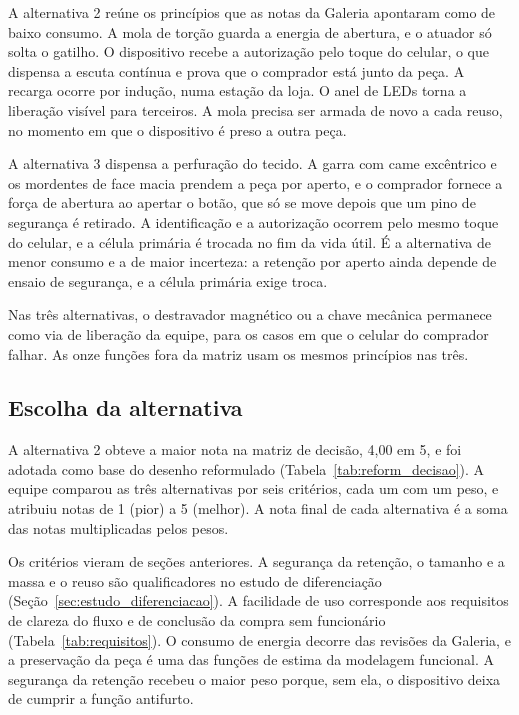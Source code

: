 A alternativa 2 reúne os princípios que as notas da Galeria apontaram como de baixo consumo. A mola de torção guarda a energia de abertura, e o atuador só solta o gatilho. O dispositivo recebe a autorização pelo toque do celular, o que dispensa a escuta contínua e prova que o comprador está junto da peça. A recarga ocorre por indução, numa estação da loja. O anel de LEDs torna a liberação visível para terceiros. A mola precisa ser armada de novo a cada reuso, no momento em que o dispositivo é preso a outra peça.

A alternativa 3 dispensa a perfuração do tecido. A garra com came excêntrico e os mordentes de face macia prendem a peça por aperto, e o comprador fornece a força de abertura ao apertar o botão, que só se move depois que um pino de segurança é retirado. A identificação e a autorização ocorrem pelo mesmo toque do celular, e a célula primária é trocada no fim da vida útil. É a alternativa de menor consumo e a de maior incerteza: a retenção por aperto ainda depende de ensaio de segurança, e a célula primária exige troca.

Nas três alternativas, o destravador magnético ou a chave mecânica permanece como via de liberação da equipe, para os casos em que o celular do comprador falhar. As onze funções fora da matriz usam os mesmos princípios nas três.

\subsection{Escolha da alternativa}
\label{subsec:reform_escolha}

A alternativa 2 obteve a maior nota na matriz de decisão, 4,00 em 5, e foi adotada como base do desenho reformulado (Tabela~\ref{tab:reform_decisao}). A equipe comparou as três alternativas por seis critérios, cada um com um peso, e atribuiu notas de 1 (pior) a 5 (melhor). A nota final de cada alternativa é a soma das notas multiplicadas pelos pesos.

Os critérios vieram de seções anteriores. A segurança da retenção, o tamanho e a massa e o reuso são qualificadores no estudo de diferenciação (Seção~\ref{sec:estudo_diferenciacao}). A facilidade de uso corresponde aos requisitos de clareza do fluxo e de conclusão da compra sem funcionário (Tabela~\ref{tab:requisitos}). O consumo de energia decorre das revisões da Galeria, e a preservação da peça é uma das funções de estima da modelagem funcional. A segurança da retenção recebeu o maior peso porque, sem ela, o dispositivo deixa de cumprir a função antifurto.

